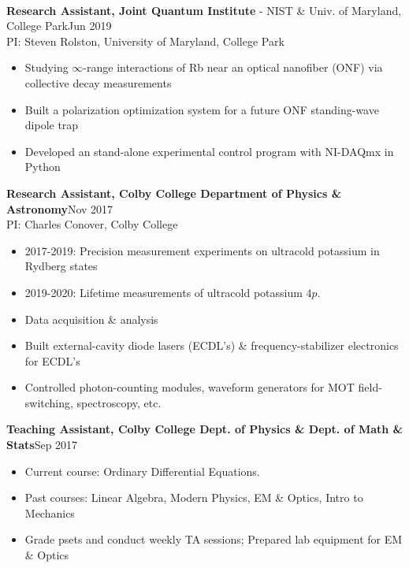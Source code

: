 \documentclass[letter, 10pt]{article}
\newcommand{\longunderline}[1]{\uline{#1\hfill\mbox{}}}
\begin{document}
	\vspace{-7pt}
	\noindent \longunderline{\normalsize{{}}}
	\\ \vspace{-7pt}
	
	\noindent \textbf{Research Assistant, Joint Quantum Institute} - NIST \& Univ. of Maryland, College Park\hfill Jun 2019\textemdash \\ 
	\noindent PI: {Steven Rolston}, University of Maryland, College Park
	\begin{itemize}[noitemsep, nolistsep]
		\item Studying $\infty$-range interactions of Rb near an optical nanofiber (ONF) via collective decay measurements
		\item Built a polarization optimization system for a future ONF standing-wave dipole trap 
		\item Developed an stand-alone experimental control program with NI-DAQmx in Python
	\end{itemize}
	\textbf{Research Assistant, Colby College Department of Physics \& Astronomy}\hfill Nov 2017\textemdash\\
	PI: {Charles Conover}, Colby College
	\begin{itemize}[noitemsep, nolistsep]
		\item 2017-2019: Precision measurement experiments on ultracold potassium in Rydberg states
		\item 2019-2020: Lifetime measurements of ultracold potassium $4p$.
		\item Data acquisition \& analysis
		\item Built external-cavity diode lasers (ECDL's) \& frequency-stabilizer electronics for ECDL's
		\item Controlled photon-counting modules, waveform generators for MOT field-switching, spectroscopy, etc.

	\end{itemize}	
 	\textbf{Teaching Assistant, Colby College Dept. of Physics \& Dept. of Math \& Stats}\hfill Sep  2017\textemdash  
	\begin{itemize}[noitemsep, nolistsep]
		\item Current course: Ordinary Differential Equations. 
		\item Past courses: Linear Algebra, Modern Physics, EM \& Optics, Intro to Mechanics
		\item Grade psets and conduct weekly TA sessions; Prepared lab equipment for EM \& Optics
	\end{itemize}
\end{document}
